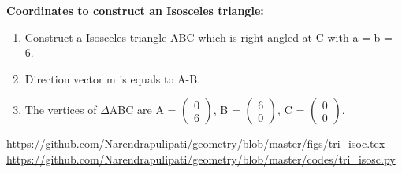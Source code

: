 \begin{frame}
\textbf{Coordinates to construct an Isosceles triangle:}
\begin{enumerate}
\item Construct a Isosceles triangle ABC which is right angled at C with a = b = 6.
\item Direction vector m is equals to A-B.
\item The vertices of $\Delta$ABC are A = $\begin{pmatrix} 0\\6 \end{pmatrix}$, B = $\begin{pmatrix} 6\\0 \end{pmatrix}$, C = $\begin{pmatrix} 0\\0 \end{pmatrix}.$ 
\end{enumerate}
\url{https://github.com/Narendrapulipati/geometry/blob/master/figs/tri_isoc.tex}
\url{https://github.com/Narendrapulipati/geometry/blob/master/codes/tri_isosc.py}
\end{frame}